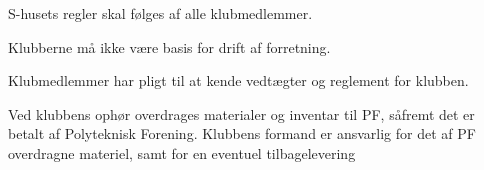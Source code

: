 \begin{list}
\item S-husets regler skal følges af alle klubmedlemmer.

\item Klubberne må ikke være basis for drift af forretning.

\item Klubmedlemmer har pligt til at kende vedtægter og reglement for klubben.

\item Ved klubbens ophør overdrages materialer og inventar til PF, såfremt det er betalt af Polyteknisk Forening. Klubbens formand er ansvarlig for det af PF overdragne materiel, samt for en eventuel tilbagelevering
\end{list}